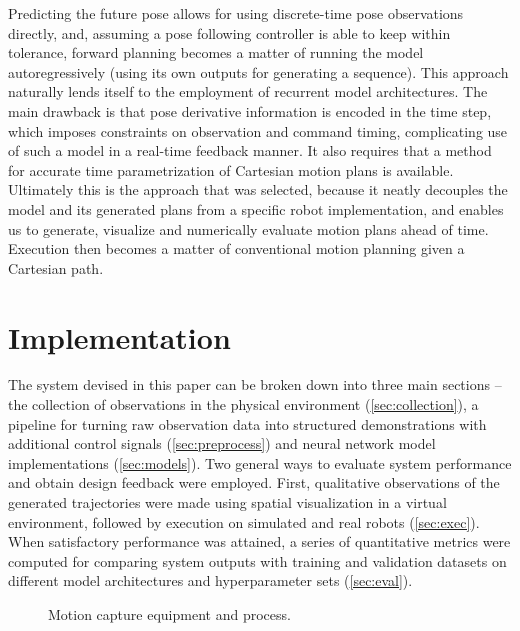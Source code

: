 \documentclass{article}
\begin{document}
Predicting the future pose allows for using discrete-time pose observations directly, and, assuming a pose following controller is able to keep within tolerance, forward planning becomes a matter of running the model autoregressively (using its own outputs for generating a sequence). This approach naturally lends itself to the employment of recurrent model architectures. The main drawback is that pose derivative information is encoded in the time step, which imposes constraints on observation and command timing, complicating use of such a model in a real-time feedback manner. It also requires that a method for accurate time parametrization of Cartesian motion plans is available. Ultimately this is the approach that was selected, because it neatly decouples the model and its generated plans from a specific robot implementation, and enables us to generate, visualize and numerically evaluate motion plans ahead of time. Execution then becomes a matter of conventional motion planning given a Cartesian path.


\section{Implementation}
\label{sec:materials}

The system devised in this paper can be broken down into three main sections -- the collection of observations in the physical environment (\ref{sec:collection}), a pipeline for turning raw observation data into structured demonstrations with additional control signals (\ref{sec:preprocess}) and neural network model implementations (\ref{sec:models}). Two general ways to evaluate system performance and obtain design feedback were employed. First, qualitative observations of the generated trajectories were made using spatial visualization in a virtual environment, followed by execution on simulated and real robots (\ref{sec:exec}). When satisfactory performance was attained, a series of quantitative metrics were computed for comparing system outputs with training and validation datasets on different model architectures and hyperparameter sets (\ref{sec:eval}).

\begin{figure}
	\centering
	\caption{Motion capture equipment and process. }
	\label{fig:fig1}
\end{figure}
\end{document}

